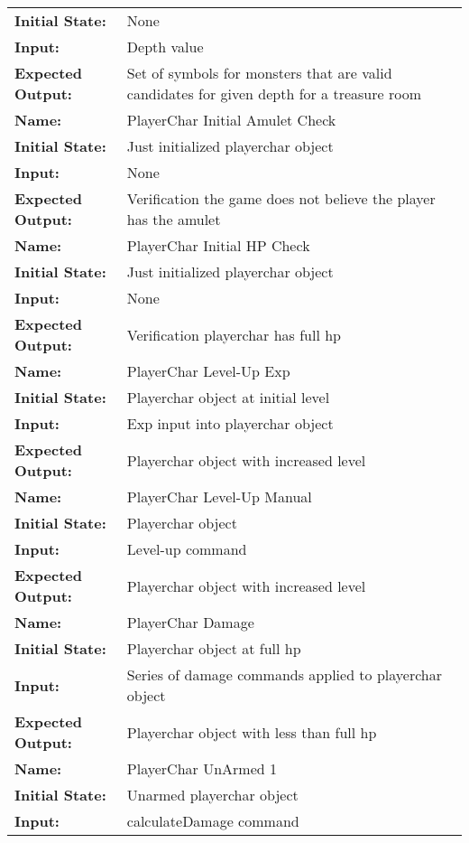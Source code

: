 \documentclass[12pt, titlepage]{article}
\begin{document}
\begin{center}
\begin{longtable}{ l | p{10cm} }
				\textbf{Initial State:} & None\\
				\textbf{Input:} & Depth value\\
				\textbf{Expected Output:} & Set of symbols for monsters that are valid candidates for given depth for a treasure room\\
				\hline
				\textbf{Name:} & PlayerChar Initial Amulet Check\\
				\textbf{Initial State:} & Just initialized playerchar object\\
				\textbf{Input:} & None\\
				\textbf{Expected Output:} & Verification the game does not believe the player has the amulet\\
				\hline
				\textbf{Name:} & PlayerChar Initial HP Check\\
				\textbf{Initial State:} & Just initialized playerchar object\\
				\textbf{Input:} & None\\
				\textbf{Expected Output:} & Verification playerchar has full hp\\
				\hline
				\textbf{Name:} & PlayerChar Level-Up Exp\\
				\textbf{Initial State:} & Playerchar object at initial level\\
				\textbf{Input:} & Exp input into playerchar object\\
				\textbf{Expected Output:} & Playerchar object with increased level\\
				\hline
				\textbf{Name:} & PlayerChar Level-Up Manual\\
				\textbf{Initial State:} & Playerchar object\\
				\textbf{Input:} & Level-up command\\
				\textbf{Expected Output:} & Playerchar object with increased level\\
				\hline
				\textbf{Name:} & PlayerChar Damage\\
				\textbf{Initial State:} & Playerchar object at full hp\\
				\textbf{Input:} & Series of damage commands applied to playerchar object\\
				\textbf{Expected Output:} & Playerchar object with less than full hp\\
				\hline
				\textbf{Name:} & PlayerChar UnArmed 1\\
				\textbf{Initial State:} & Unarmed playerchar object\\
				\textbf{Input:} & calculateDamage command\\

\end{longtable}
\end{center}
\end{document}
